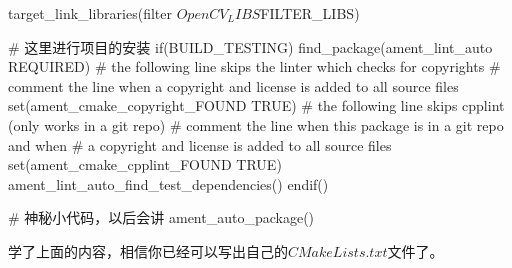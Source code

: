 \begin{tpython}
target_link_libraries(filter ${OpenCV_LIBS} ${FILTER_LIBS})

# 这里进行项目的安装
if(BUILD_TESTING)
    find_package(ament_lint_auto REQUIRED)
    # the following line skips the linter which checks for copyrights
    # comment the line when a copyright and license is added to all source files
    set(ament_cmake_copyright_FOUND TRUE)
    # the following line skips cpplint (only works in a git repo)
    # comment the line when this package is in a git repo and when
    # a copyright and license is added to all source files
    set(ament_cmake_cpplint_FOUND TRUE)
    ament_lint_auto_find_test_dependencies()
endif()

# 神秘小代码，以后会讲
ament_auto_package()    
\end{tpython}

学了上面的内容，相信你已经可以写出自己的$CMakeLists.txt$文件了。
